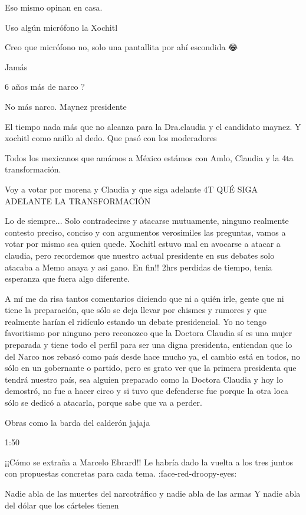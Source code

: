 Eso mismo opinan en casa.

Uso algún micrófono la Xochitl

Creo que micrófono no, solo una pantallita por ahí escondida 😂

Jamás

6 años más de narco ? 🤡

No más narco. Maynez presidente

El tiempo  nada más que no alcanza para la Dra.claudia y el candidato maynez. 
Y xochitl como anillo al dedo. Que  pasó con los moderadores

Todos los mexicanos que amámos a México estámos con Amlo, Claudia y la 4ta transformación.

Voy a votar por morena y Claudia y que siga adelante 4T  QUÉ SIGA ADELANTE LA TRANSFORMACIÓN

Lo de siempre... 
Solo contradecirse y atacarse mutuamente, ninguno realmente contesto preciso, conciso y con argumentos verosimiles las preguntas, vamos a votar por mismo sea quien quede. Xochitl estuvo mal en avocarse a atacar a claudia, pero recordemos que nuestro actual presidente en sus debates solo atacaba a Memo anaya y asi gano. En fin!! 2hrs perdidas de tiempo, tenia esperanza que fuera algo diferente.

A mí me da risa tantos comentarios diciendo que ni a quién irle, gente que ni tiene la preparación, que sólo se deja llevar por chismes y rumores y que realmente harían el ridículo estando un debate presidencial. Yo no tengo favoritismo por ninguno pero reconozco que la Doctora Claudia sí es una mujer preparada y tiene todo el perfil para ser una digna presidenta, entiendan que lo del Narco nos rebasó como país desde hace mucho ya, el cambio está en todos, no sólo en un gobernante o partido, pero es grato ver que la primera presidenta que tendrá nuestro país, sea alguien preparado como la Doctora Claudia y hoy lo demostró, no fue a hacer circo y si tuvo que defenderse fue porque la otra loca sólo se dedicó a atacarla, porque sabe que va a perder.

Obras como la barda del calderón jajaja

1:50

¡¡Cómo se extraña a Marcelo Ebrard!!  Le habría dado la vuelta a los tres juntos con propuestas concretas para cada tema. :face-red-droopy-eyes:

Nadie abla de las muertes del narcotráfico y nadie abla de las armas 
Y nadie abla del dólar que los 
cárteles tienen

